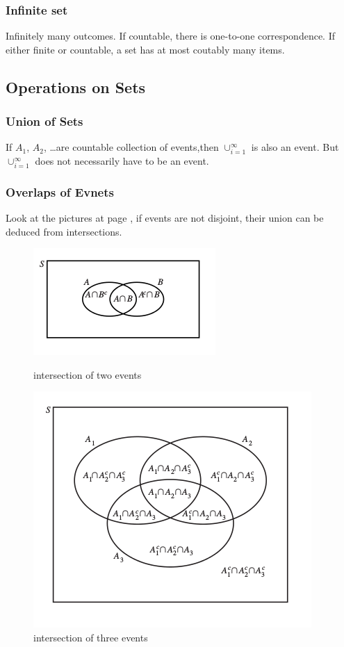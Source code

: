 \documentclass{book}
\begin{document}
			\subsubsection{Infinite set}
			Infinitely many outcomes.  If countable, there 
			is one-to-one correspondence.  If either finite or countable, 
			a set has at most coutably many items.  

		\subsection{Operations on Sets}
			\subsubsection{Union of Sets}
			If $A_1$, $A_2$, \ldots  are countable collection of events,then 
			$\cup_{i=1}^{\infty}$ is also an event.  But $\cup_{i=1}^{\infty}$ 
			does not necessarily have to be an event.  

			\subsubsection{Overlaps of Evnets}
			Look at the pictures at page \pageref{fig:intersection_1}, 
			if events are not disjoint, their union can be deduced from intersections.  
			\begin{figure}[b]
				\centering
				\includegraphics[scale=0.5]{PartitionByTwo}
				\caption{intersection of two events}
				\label{fig:intersection_1}
				\includegraphics[scale=0.5]{PartitionByThree}
				\caption{intersection of three events}
				\label{fig:intersection_2}
			\end{figure}
\end{document}
